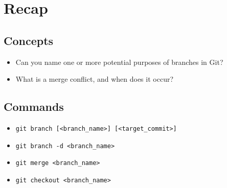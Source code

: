 \documentclass[../main/git_course_main.tex]{subfiles}
\begin{document}
	
	\newpage
	\section{Recap}
	
	\subsection{Concepts}
	
	\begin{itemize}
		\item Can you name one or more potential purposes of branches in Git?
		\item What is a merge conflict, and when does it occur?
	\end{itemize}
	
	\subsection{Commands}
	
	\begin{itemize}
		\item \verb$git branch [<branch_name>] [<target_commit>]$
		\item \verb$git branch -d <branch_name>$
		\item \verb$git merge <branch_name>$
		\item \verb$git checkout <branch_name>$
	\end{itemize}
	
\end{document}
